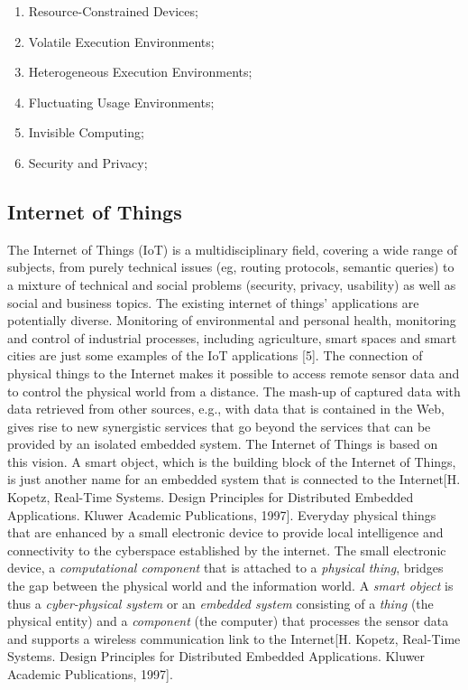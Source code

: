 \documentclass{acm_proc_article-sp}
\begin{document}
\begin{enumerate}
\item Resource-Constrained Devices; 	
\item Volatile Execution Environments; 	
\item Heterogeneous Execution Environments;
\item Fluctuating Usage Environments;
\item Invisible Computing;
\item Security and Privacy;
\end{enumerate}


\subsection{Internet of Things}
The Internet of Things (IoT) is a multidisciplinary field, covering a wide range of subjects, from purely technical issues (eg, routing protocols, semantic queries) to a mixture of technical and social problems (security, privacy, usability) as well as social and business topics. The existing internet of things’ applications are potentially diverse. Monitoring of environmental and personal health, monitoring and control of industrial processes, including agriculture, smart spaces and smart cities are just some examples of the IoT applications [5].
\newline
\newline
The connection of physical things to the Internet makes it possible to access remote sensor data and to control the physical world from a distance. The mash-up of captured data with data retrieved from other sources, e.g., with data that is contained in the Web, gives rise to new synergistic services that go beyond the services that can be provided by an isolated embedded system. The Internet of Things is based on this vision. A smart object, which is the building block of the Internet of Things, is just another name for an embedded system that is connected to the Internet[H. Kopetz, Real-Time Systems. Design Principles for Distributed Embedded
Applications. Kluwer Academic Publications, 1997].
\newline
\newline
Everyday physical things that are enhanced by a small electronic device to provide local intelligence and connectivity to the cyberspace established by the internet. The small electronic device, a \textit{computational component} that is attached to a \textit{physical thing}, bridges the gap between the physical world and the information world. A \textit{smart object} is thus a \textit{cyber-physical system} or an \textit{embedded system} consisting of a \textit{thing} (the physical entity) and a \textit{component} (the computer) that processes the sensor data and supports a wireless communication link to the Internet[H. Kopetz, Real-Time Systems. Design Principles for Distributed Embedded
Applications. Kluwer Academic Publications, 1997].
\end{document}
